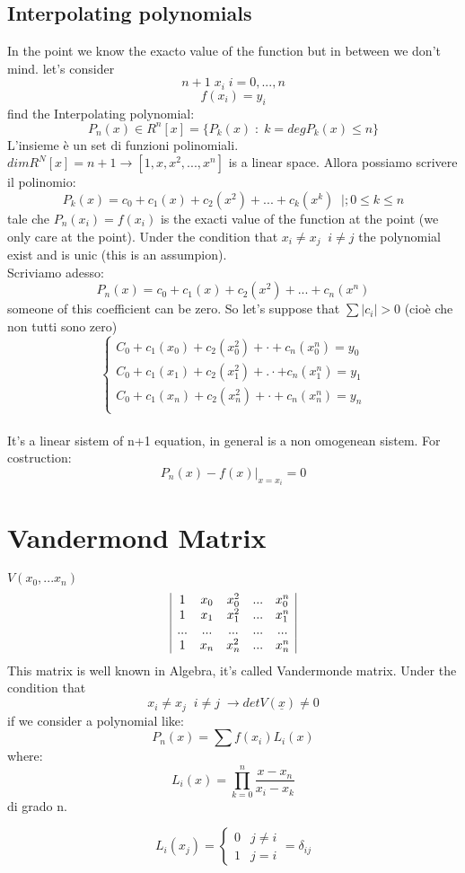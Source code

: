 \subsection{Interpolating polynomials}
In the point we know the exacto value of the function but in between we don't mind.
let's consider 
\[n+1 \; x_i \; i=0,...,n\]
\[f(x_i)=y_i\]
find the Interpolating polynomial:
\[P_n(x) \in R^n[x]=\{P_k(x) \; : \; k=degP_k(x)\le n\}\]
L'insieme è un set di funzioni polinomiali.
\\
$dimR^N[x]=n+1 \rightarrow [1,x,x^2,...,x^n]$  is a linear space. Allora possiamo scrivere il polinomio:
\[P_k(x)=c_0+c_1(x)+c_2(x^2)+...+c_k(x^k) \; \; |; 0\le k \le n\] tale che $P_n(x_i)=f(x_i)$ is the exacti value of the function at the point (we only care at the point).
Under the condition that $x_i \neq x_j \;\; i \neq j$ the polynomial exist and is unic (this is an assumpion).
\\
Scriviamo adesso:\[P_n(x)=c_0+c_1(x)+c_2(x^2)+...+c_n(x^n)\] someone of this coefficient can be zero. So let's suppose that $\sum|c_i|>0$ (cioè che non tutti sono zero)
$$\begin{cases}
 C_0+c_1(x_0)+c_2(x^2_0)+\cdot+c_n(x^n_0)=y_0 \\
C_0+c_1(x_1)+c_2(x^2_1)+.\cdot+c_n(x^n_1)=y_1 \\
C_0+c_1(x_n)+c_2(x^2_n)+\cdot+c_n(x^n_n)=y_n \\ 
\end{cases}$$
\\
It's a linear sistem of n+1 equation, in general is a non omogenean sistem. For costruction:
\[P_n(x)-f(x)|_{x=x_i}=0\]
\section{Vandermond Matrix}
$V(x_0,...x_n)$
$$
\begin{array}{|c c c c c|}
   1  &x_0 & x^2_0 &...&x^n_0 \\ 
1  & x_1 & x^2_1 &...&x^n_1 \\
...  &... & ... &...&...\\
1  &x_n & x^2_n &...&x^n_n  
\end{array}$$
This matrix is well known in Algebra, it's called Vandermonde matrix.
Under the condition that \[x_i\neq x_j \;\; i \neq j \; \rightarrow detV(\underline{x}) \neq 0\]
if we consider a polynomial like:
$$P_n(x)=\sum f(x_i) L_i(x)$$
where:
$$L_i(x)= \prod^n_{k=0}\frac{x-x_n}{x_i-x_k}$$ di grado n.

$$L_i(x_j)= \begin{cases}
    0 & j \neq i\\
    1 & j=i
\end{cases} = \delta_{ij}$$

